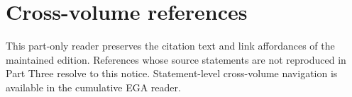 \clearpage
{}
\section*{Cross-volume references}

This part-only reader preserves the citation text and link affordances of the
maintained edition.  References whose source statements are not reproduced in
Part Three resolve to this notice.  Statement-level cross-volume navigation is
available in the cumulative EGA reader.

\label{0.2.1.8}
\label{0.2.2.2}
\label{0.6.3.4}
\label{0.7.3.5}
\label{0.9.2.5}

\makeatletter
\newcommand{\EGAIVThreeRegisterExternalTargets}[1]{%
  \@for\EGAIVThreeExternalTarget:=#1\do{%
    \edef\EGAIVThreeResolvedTarget{\EGAIVThreeExternalTarget}%
    \expandafter\sgaStableTarget\expandafter{\EGAIVThreeResolvedTarget}%
  }%
}
\makeatother


